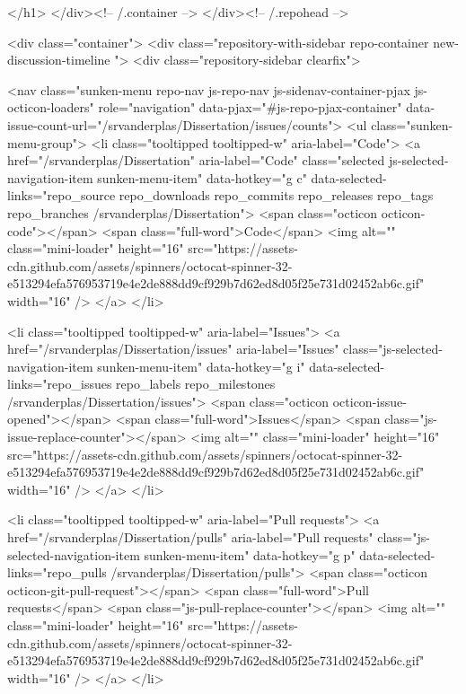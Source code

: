         </h1>
      </div><!-- /.container -->
    </div><!-- /.repohead -->

    <div class="container">
      <div class="repository-with-sidebar repo-container new-discussion-timeline  ">
        <div class="repository-sidebar clearfix">
            
<nav class="sunken-menu repo-nav js-repo-nav js-sidenav-container-pjax js-octicon-loaders"
     role="navigation"
     data-pjax="#js-repo-pjax-container"
     data-issue-count-url="/srvanderplas/Dissertation/issues/counts">
  <ul class="sunken-menu-group">
    <li class="tooltipped tooltipped-w" aria-label="Code">
      <a href="/srvanderplas/Dissertation" aria-label="Code" class="selected js-selected-navigation-item sunken-menu-item" data-hotkey="g c" data-selected-links="repo_source repo_downloads repo_commits repo_releases repo_tags repo_branches /srvanderplas/Dissertation">
        <span class="octicon octicon-code"></span> <span class="full-word">Code</span>
        <img alt="" class="mini-loader" height="16" src="https://assets-cdn.github.com/assets/spinners/octocat-spinner-32-e513294efa576953719e4e2de888dd9cf929b7d62ed8d05f25e731d02452ab6c.gif" width="16" />
</a>    </li>

      <li class="tooltipped tooltipped-w" aria-label="Issues">
        <a href="/srvanderplas/Dissertation/issues" aria-label="Issues" class="js-selected-navigation-item sunken-menu-item" data-hotkey="g i" data-selected-links="repo_issues repo_labels repo_milestones /srvanderplas/Dissertation/issues">
          <span class="octicon octicon-issue-opened"></span> <span class="full-word">Issues</span>
          <span class="js-issue-replace-counter"></span>
          <img alt="" class="mini-loader" height="16" src="https://assets-cdn.github.com/assets/spinners/octocat-spinner-32-e513294efa576953719e4e2de888dd9cf929b7d62ed8d05f25e731d02452ab6c.gif" width="16" />
</a>      </li>

    <li class="tooltipped tooltipped-w" aria-label="Pull requests">
      <a href="/srvanderplas/Dissertation/pulls" aria-label="Pull requests" class="js-selected-navigation-item sunken-menu-item" data-hotkey="g p" data-selected-links="repo_pulls /srvanderplas/Dissertation/pulls">
          <span class="octicon octicon-git-pull-request"></span> <span class="full-word">Pull requests</span>
          <span class="js-pull-replace-counter"></span>
          <img alt="" class="mini-loader" height="16" src="https://assets-cdn.github.com/assets/spinners/octocat-spinner-32-e513294efa576953719e4e2de888dd9cf929b7d62ed8d05f25e731d02452ab6c.gif" width="16" />
</a>    </li>

